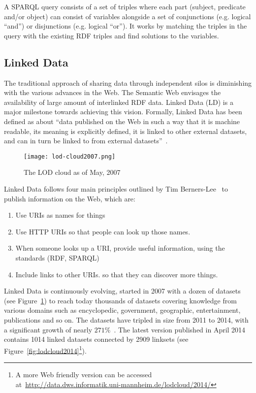 A SPARQL query consists of a set of triples where each part (subject, predicate and/or object) can consist of variables alongside a set of conjunctions (e.g. logical ``and'') or disjunctions (e.g. logical ``or''). It works by matching the triples in the query with the existing RDF triples and find solutions to the variables.

\subsection{Linked Data}

The traditional approach of sharing data through independent silos is diminishing with the various advances in the Web. The Semantic Web envisages the availability of large amount of interlinked RDF data. Linked Data (LD) is a major milestone towards achieving this vision. Formally, Linked Data has been defined as about ``data published on the Web in such a way that it is machine readable, its meaning is explicitly defined, it is linked to other external datasets, and can in turn be linked to from external datasets''~\cite{Bizer:IJSWIS:09}.

\begin{figure}[ht!]
	\texttt{[image: lod-cloud2007.png]}
	\caption{The LOD cloud as of May, 2007}
	\label{fig:lodcloud2007}
\end{figure}

Linked Data follows four main principles outlined by Tim Berners-Lee~\cite{Berners-Lee:W3C:06} to publish information on the Web, which are:

\begin{enumerate}
	\item Use URIs as names for things
	\item Use HTTP URIs so that people can look up those names.
	\item When someone looks up a URI, provide useful information, using the standards (RDF, SPARQL)
	\item Include links to other URIs. so that they can discover more things.
\end{enumerate}

Linked Data is continuously evolving, started in 2007 with a dozen of datasets (see Figure~\ref{fig:lodcloud2007}) to reach today thousands of datasets covering knowledge from various domains such as encyclopedic, government, geographic, entertainment, publications and so on. The datasets have tripled in size from 2011 to 2014, with a significant growth of nearly $271\%$~\cite{Schmachtenberg:ISWC:14}. The latest version published in April 2014 contains 1014 linked datasets connected by 2909 linksets (see Figure~\ref{fig:lodcloud2014}\footnote{A more Web friendly version can be accessed at~\url{http://data.dws.informatik.uni-mannheim.de/lodcloud/2014/}}).

